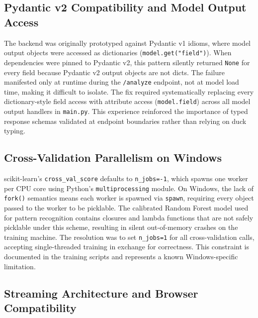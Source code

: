 \documentclass[12pt, oneside]{report}
\begin{document}
\subsection{Pydantic v2 Compatibility and Model Output Access}

The backend was originally prototyped against Pydantic v1 idioms, where model output
objects were accessed as dictionaries (\texttt{model.get("field")}). When dependencies
were pinned to Pydantic v2, this pattern silently returned \texttt{None} for every field
because Pydantic v2 output objects are not dicts. The failure manifested only at
runtime during the \texttt{/analyze} endpoint, not at model load time, making it
difficult to isolate. The fix required systematically replacing every dictionary-style
field access with attribute access (\texttt{model.field}) across all model output
handlers in \texttt{main.py}. This experience reinforced the importance of typed
response schemas validated at endpoint boundaries rather than relying on duck typing.

\subsection{Cross-Validation Parallelism on Windows}

scikit-learn's \texttt{cross\_val\_score} defaults to \texttt{n\_jobs=-1}, which
spawns one worker per CPU core using Python's \texttt{multiprocessing} module. On
Windows, the lack of \texttt{fork()} semantics means each worker is spawned via
\texttt{spawn}, requiring every object passed to the worker to be picklable. The
calibrated Random Forest model used for pattern recognition contains closures and
lambda functions that are not safely picklable under this scheme, resulting in silent
out-of-memory crashes on the training machine. The resolution was to set
\texttt{n\_jobs=1} for all cross-validation calls, accepting single-threaded training
in exchange for correctness. This constraint is documented in the training scripts
and represents a known Windows-specific limitation.

\subsection{Streaming Architecture and Browser Compatibility}
\end{document}
